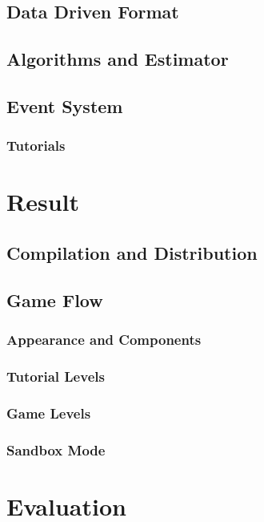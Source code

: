 \documentclass[msc,deptreport, cs]{infthesis}
\begin{document}
\section{Data Driven Format}

\section{Algorithms and Estimator}

\section{Event System}

\subsection{Tutorials}

\chapter{Result}

\section{Compilation and Distribution}

\section{Game Flow}

\subsection{Appearance and Components}

\subsection{Tutorial Levels}

\subsection{Game Levels}

\subsection{Sandbox Mode}

\chapter{Evaluation}
\end{document}
